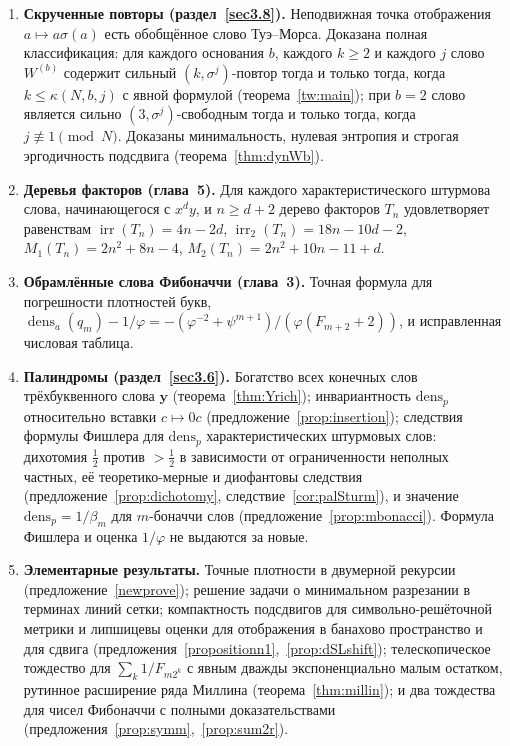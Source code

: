 \documentclass[a4paper,14pt]{extreport}
\theoremstyle{plain}
\theoremstyle{definition}
\theoremstyle{remark}
\begin{document}
	\begin{enumerate}
		\item \textbf{Скрученные повторы (раздел~\ref{sec3.8}).} Неподвижная точка отображения $a\mapsto a\sigma(a)$ есть обобщённое слово Туэ--Морса. Доказана полная классификация: для каждого основания $b$, каждого $k\ge2$ и каждого $j$ слово $W^{(b)}$ содержит сильный $(k,\sigma^j)$-повтор тогда и только тогда, когда $k\le\kappa(N,b,j)$ с явной формулой (теорема~\ref{tw:main}); при $b=2$ слово является сильно $(3,\sigma^j)$-свободным тогда и только тогда, когда $j\not\equiv1\pmod N$. Доказаны минимальность, нулевая энтропия и строгая эргодичность подсдвига (теорема~\ref{thm:dynWb}).
		
		\item \textbf{Деревья факторов (глава~5).} Для каждого характеристического штурмова слова, начинающегося с $x^dy$, и $n\ge d+2$ дерево факторов $T_n$ удовлетворяет равенствам $\operatorname{irr}(T_n)=4n-2d$, $\operatorname{irr}_2(T_n)=18n-10d-2$, $M_1(T_n)=2n^2+8n-4$, $M_2(T_n)=2n^2+10n-11+d$.
		
		\item \textbf{Обрамлённые слова Фибоначчи (глава~3).} Точная формула для погрешности плотностей букв, $\operatorname{dens}_a(q_m)-1/\varphi=-(\varphi^{-2}+\psi^{m+1})/(\varphi(F_{m+2}+2))$, и исправленная числовая таблица.
		
		\item \textbf{Палиндромы (раздел~\ref{sec3.6}).} Богатство всех конечных слов трёхбуквенного слова $\mathbf y$ (теорема~\ref{thm:Yrich}); инвариантность $\mathrm{dens}_p$ относительно вставки $c\mapsto 0c$ (предложение~\ref{prop:insertion}); следствия формулы Фишлера для $\mathrm{dens}_p$ характеристических штурмовых слов: дихотомия $\tfrac12$ против $>\tfrac12$ в зависимости от ограниченности неполных частных, её теоретико-мерные и диофантовы следствия (предложение~\ref{prop:dichotomy}, следствие~\ref{cor:palSturm}), и значение $\mathrm{dens}_p=1/\beta_m$ для $m$-боначчи слов (предложение~\ref{prop:mbonacci}). Формула Фишлера и оценка $1/\varphi$ не выдаются за новые.
		
		\item \textbf{Элементарные результаты.} Точные плотности в двумерной рекурсии (предложение~\ref{newprove}); решение задачи о минимальном разрезании в терминах линий сетки; компактность подсдвигов для символьно-решёточной метрики и липшицевы оценки для отображения в банахово пространство и для сдвига (предложения~\ref{propositionn1},~\ref{prop:dSLshift}); телескопическое тождество для $\sum_k 1/F_{m2^k}$ с явным дважды экспоненциально малым остатком, рутинное расширение ряда Миллина (теорема~\ref{thm:millin}); и два тождества для чисел Фибоначчи с полными доказательствами (предложения~\ref{prop:symm},~\ref{prop:sum2r}).
		

\end{enumerate}
\end{document}

